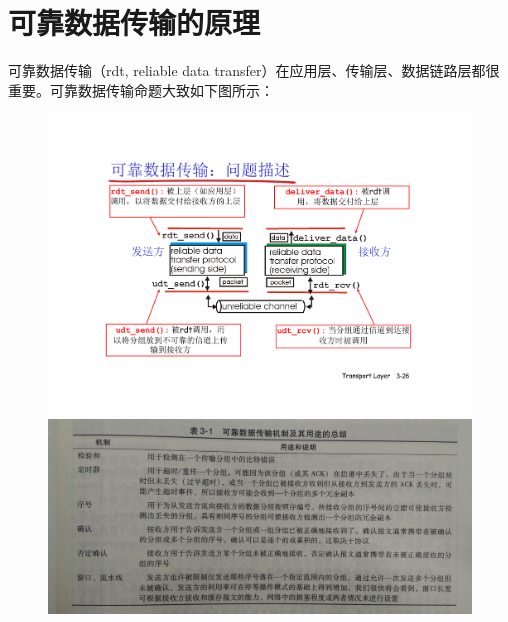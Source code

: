 \documentclass[]{report}
\begin{document}
	\section{可靠数据传输的原理}
		可靠数据传输（rdt, reliable data transfer）在应用层、传输层、数据链路层都很重要。可靠数据传输命题大致如下图所示：
		\begin{figure}[h!]
			\centering
			\begin{minipage}{40em}
				\centering
				\includegraphics[scale = 0.4]{images/RDT_and_Unreliable_Channel.pdf}
			\end{minipage}
			\begin{minipage}{40em}
				\centering
				\includegraphics[scale = 0.1]{images/KeKaoShuJuChanShuZongJie.jpg}
			\end{minipage}
		\end{figure}
\end{document}
